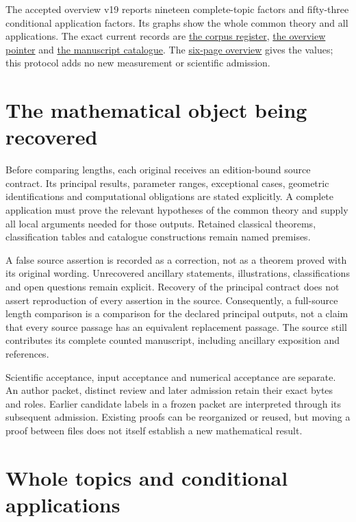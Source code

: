 \documentclass[11pt,a4paper]{article}
\begin{document}
The accepted overview v19 reports nineteen complete-topic factors and fifty-three
conditional application factors. Its graphs show the whole common theory and
all applications. The exact current records are
\href{corpus/latest.json}{the corpus register},
\href{overview/latest.json}{the overview pointer} and
\href{../papers/latest_catalogue.json}{the manuscript catalogue}.
The \href{overview/v19/packet/reader.pdf}{six-page overview} gives the values;
this protocol adds no new measurement or scientific admission.

\section{The mathematical object being recovered}

Before comparing lengths, each original receives an edition-bound source
contract. Its principal results, parameter ranges, exceptional cases, geometric
identifications and computational obligations are stated explicitly. A complete
application must prove the relevant hypotheses of the common theory and supply
all local arguments needed for those outputs. Retained classical theorems,
classification tables and catalogue constructions remain named premises.

A false source assertion is recorded as a correction, not as a theorem proved
with its original wording. Unrecovered ancillary statements, illustrations,
classifications and open questions remain explicit. Recovery of the principal
contract does not assert reproduction of every assertion in the source.
Consequently, a full-source length comparison is a comparison for the declared
principal outputs, not a claim that every source passage has an equivalent
replacement passage. The source still contributes its complete counted
manuscript, including ancillary exposition and references.

Scientific acceptance, input acceptance and numerical acceptance are separate.
An author packet, distinct review and later admission retain their exact bytes
and roles. Earlier candidate labels in a frozen packet are interpreted through
its subsequent admission. Existing proofs can be reorganized or reused, but
moving a proof between files does not itself establish a new mathematical result.

\section{Whole topics and conditional applications}
\end{document}
